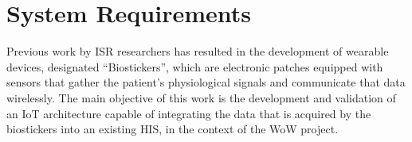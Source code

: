






\section{System Requirements}

Previous work by \acs{ISR} researchers has resulted in the development of wearable devices, designated ``Biostickers'', which are electronic patches equipped with sensors that gather the patient's physiological signals and communicate that data wirelessly. 
The main objective of this work is the development and validation of an \acs{IoT} architecture capable of integrating the data that is acquired by the biostickers into an existing \acs{HIS}, in the context of the \acs{WoW} project. 

